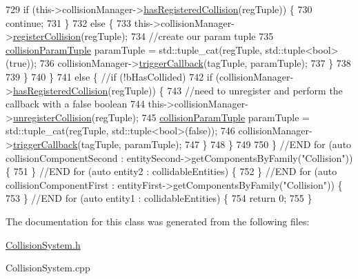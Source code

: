 \begin{DoxyCode}
729                     \textcolor{keywordflow}{if} (this->collisionManager->\hyperlink{class_collision_manager_a3dd0b50dcdee6bfd6ddcdaf7eec0c66b}{hasRegisteredCollision}(regTuple)) \{
730                         \textcolor{keywordflow}{continue};
731                     \}
732                     \textcolor{keywordflow}{else} \{
733                         this->collisionManager->\hyperlink{class_collision_manager_abe04add405129184fdb5b76c079fd34a}{registerCollision}(regTuple);
734                         \textcolor{comment}{//create our param tuple}
735                         \hyperlink{_collision_manager_8h_aa4e5677732161da0be677d67bec17ea6}{collisionParamTuple} paramTuple = std::tuple\_cat(regTuple, 
      std::tuple<bool>(\textcolor{keyword}{true}));
736                         collisionManager->\hyperlink{class_collision_manager_aaf5aa4a712415540ce7313ec9e96dcef}{triggerCallback}(tagTuple, paramTuple);
737                     \}
738                     
739                 \}
740             \}
741             \textcolor{keywordflow}{else} \{ \textcolor{comment}{//if (!bHasCollided)}
742                 \textcolor{keywordflow}{if} (collisionManager->\hyperlink{class_collision_manager_a3dd0b50dcdee6bfd6ddcdaf7eec0c66b}{hasRegisteredCollision}(regTuple)) \{
743                     \textcolor{comment}{//need to unregister and perform the callback with a false boolean}
744                     this->collisionManager->\hyperlink{class_collision_manager_ad92675882f024a11730b1276b0949f04}{unregisterCollision}(regTuple);
745                     \hyperlink{_collision_manager_8h_aa4e5677732161da0be677d67bec17ea6}{collisionParamTuple} paramTuple = std::tuple\_cat(regTuple, 
      std::tuple<bool>(\textcolor{keyword}{false}));
746                     collisionManager->\hyperlink{class_collision_manager_aaf5aa4a712415540ce7313ec9e96dcef}{triggerCallback}(tagTuple, paramTuple);
747                 \}
748             \}
749 
750         \} \textcolor{comment}{//END for (auto collisionComponentSecond : entitySecond->getComponentsByFamily("Collision")) \{}
751         \} \textcolor{comment}{//END for (auto entity2 : collidableEntities) \{}
752     \} \textcolor{comment}{//END for (auto collisionComponentFirst : entityFirst->getComponentsByFamily("Collision")) \{}
753     \} \textcolor{comment}{//END for (auto entity1 : collidableEntities) \{}
754     \textcolor{keywordflow}{return} 0;
755 \}\end{DoxyCode}


The documentation for this class was generated from the following files\-:\begin{DoxyCompactItemize}
\item 
\hyperlink{_collision_system_8h}{Collision\-System.\-h}\item 
Collision\-System.\-cpp\end{DoxyCompactItemize}
